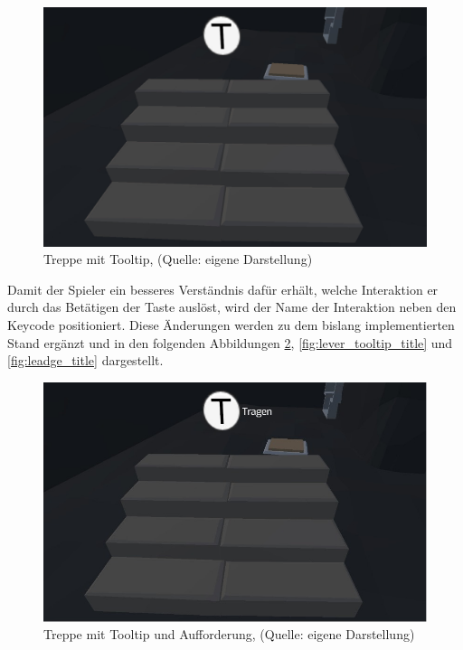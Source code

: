 \begin{figure}[ht]
\centering
\includegraphics[width=0.8\linewidth]{content/pictures/carry_tooltip.jpg}
\caption{Treppe mit Tooltip, (Quelle: eigene Darstellung)}
\label{fig:stair_tooltip}
\end{figure}

Damit der Spieler ein besseres Verständnis dafür erhält, welche Interaktion er durch das Betätigen der Taste auslöst, wird der Name der Interaktion neben den Keycode positioniert. Diese Änderungen werden zu dem bislang implementierten Stand ergänzt und in den folgenden Abbildungen \ref{fig:stair_tooltip_title}, \ref{fig:lever_tooltip_title} und \ref{fig:leadge_title} dargestellt.

\begin{figure}[ht]
\centering
\includegraphics[width=0.8\linewidth]{content/pictures/stair_tooltip_title.jpg}
\caption{Treppe mit Tooltip und Aufforderung, (Quelle: eigene Darstellung)}
\label{fig:stair_tooltip_title}
\end{figure}

